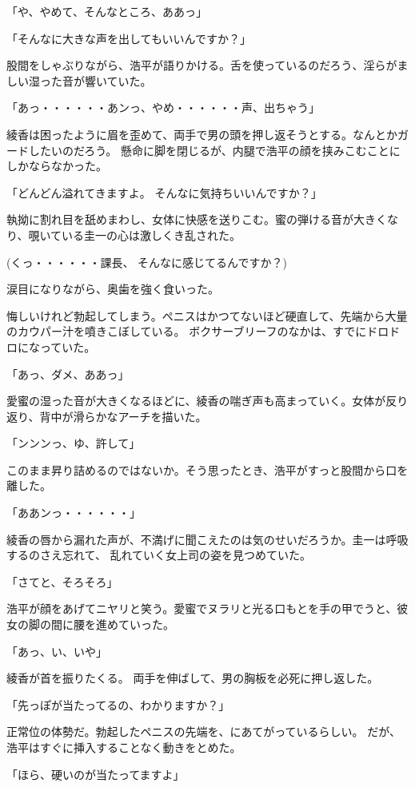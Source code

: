 ﻿\documentclass[book,tate]{jlreq}
\begin{document}
「や、やめて、そんなところ、ああっ」

「そんなに大きな声を出してもいいんですか？」

股間をしゃぶりながら、浩平が語りかける。舌を使っているのだろう、淫らがましい湿った音が響いていた。

「あっ・・・・・・あンっ、やめ・・・・・・声、出ちゃう」

綾香は困ったように眉を歪めて、両手で男の頭を押し返そうとする。なんとかガードしたいのだろう。
懸命に脚を閉じるが、内腿で浩平の顔を挟みこむことにしかならなかった。

「どんどん溢れてきますよ。 そんなに気持ちいいんですか？」

執拗に割れ目を舐めまわし、女体に快感を送りこむ。蜜の弾ける音が大きくなり、覗いている圭一の心は激しくき乱された。

(くっ・・・・・・課長、 そんなに感じてるんですか？)

涙目になりながら、奥歯を強く食いった。

悔しいけれど勃起してしまう。ペニスはかつてないほど硬直して、先端から大量のカウパー汁を噴きこぼしている。
ボクサーブリーフのなかは、すでにドロドロになっていた。

「あっ、ダメ、ああっ」

愛蜜の湿った音が大きくなるほどに、綾香の喘ぎ声も高まっていく。女体が反り返り、背中が滑らかなアーチを描いた。

「ンンンっ、ゆ、許して」

このまま昇り詰めるのではないか。そう思ったとき、浩平がすっと股間から口を離した。

「ああンっ・・・・・・」

綾香の唇から漏れた声が、不満げに聞こえたのは気のせいだろうか。圭一は呼吸するのさえ忘れて、
乱れていく女上司の姿を見つめていた。

「さてと、そろそろ」

浩平が顔をあげてニヤリと笑う。愛蜜でヌラリと光る口もとを手の甲でうと、彼女の脚の間に腰を進めていった。

「あっ、い、いや」

綾香が首を振りたくる。 両手を伸ばして、男の胸板を必死に押し返した。

「先っぽが当たってるの、わかりますか？」

正常位の体勢だ。勃起したペニスの先端を、にあてがっているらしい。
だが、浩平はすぐに挿入することなく動きをとめた。

「ほら、硬いのが当たってますよ」
\end{document}
